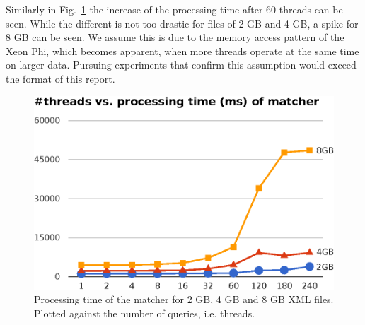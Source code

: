 Similarly in Fig.~\ref{matcher_performance} the increase of the processing time after 60 threads can be seen. While the different is not too drastic for files of 2 GB and 4 GB, a spike for 8 GB can be seen. We assume this is due to the memory access pattern of the Xeon Phi, which becomes apparent, when more threads operate at the same time on larger data. Pursuing experiments that confirm this assumption would exceed the format of this report.

\begin{figure}\centering
  \includegraphics[scale=.66]{img/matcher_processing_time.eps}
  \caption{Processing time of the matcher for 2 GB, 4 GB and 8 GB XML files. Plotted against the number of queries, i.e. threads.\label{matcher_performance}}
\end{figure}